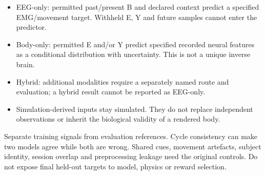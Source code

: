 \begin{itemize}
\item EEG-only: permitted past/present B and declared context predict a specified   EMG/movement target. Withheld E, Y and future samples cannot enter the predictor.
\item Body-only: permitted E and/or Y predict specified recorded neural features as   a conditional distribution with uncertainty. This is not a unique inverse brain.
\item Hybrid: additional modalities require a separately named route and evaluation;   a hybrid result cannot be reported as EEG-only.
\item Simulation-derived inputs stay simulated. They do not replace independent   observations or inherit the biological validity of a rendered body.
\end{itemize}

Separate training signals from evaluation references. Cycle consistency can make two models agree while both are wrong. Shared cues, movement artefacts, subject identity, session overlap and preprocessing leakage need the original controls. Do not expose final held-out targets to model, physics or reward selection.

